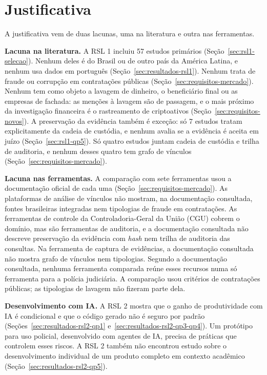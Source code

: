 \section{Justificativa}
\label{sec:intro-justificativa}

A justificativa vem de duas lacunas, uma na literatura e outra nas
ferramentas.

\textbf{Lacuna na literatura.} A RSL 1 incluiu 57 estudos primários
(Seção~\ref{sec:rsl1-selecao}). Nenhum deles é do Brasil ou de outro país da
América Latina, e nenhum usa dados em português
(Seção~\ref{sec:resultados-rsl1}). Nenhum trata de fraude ou corrupção em
contratações públicas (Seção~\ref{sec:requisitos-mercado}). Nenhum tem como
objeto a lavagem de dinheiro, o beneficiário final ou as empresas de
fachada: as menções à lavagem são de passagem, e o mais próximo da
investigação financeira é o rastreamento de criptoativos
(Seção~\ref{sec:requisitos-novos}). A preservação da
evidência também é exceção: só 7 estudos tratam explicitamente da cadeia de
custódia, e nenhum avalia se a evidência é aceita em juízo
(Seção~\ref{sec:rsl1-qp5}). Só quatro estudos juntam cadeia de custódia e
trilha de auditoria, e nenhum desses quatro tem grafo de vínculos
(Seção~\ref{sec:requisitos-mercado}).

\textbf{Lacuna nas ferramentas.} A comparação com sete ferramentas usou a
documentação oficial de cada uma (Seção~\ref{sec:requisitos-mercado}). As
plataformas de análise de vínculos não mostram, na documentação consultada,
fontes brasileiras integradas nem tipologias de fraude em contratações. As
ferramentas de controle da Controladoria-Geral da União (CGU) cobrem o
domínio, mas são ferramentas de auditoria, e a documentação consultada não
descreve preservação da evidência com \textit{hash} nem trilha de auditoria
das consultas. Na ferramenta de captura de evidências, a documentação
consultada não mostra grafo de vínculos nem tipologias. Segundo a
documentação consultada, nenhuma ferramenta comparada reúne esses recursos
numa só ferramenta para a polícia judiciária. A comparação usou critérios
de contratações públicas; as tipologias de lavagem não fizeram parte dela.

\textbf{Desenvolvimento com IA.} A RSL 2 mostra que o ganho de produtividade
com IA é condicional e que o código gerado não é seguro por padrão
(Seções~\ref{sec:resultados-rsl2-qp1} e~\ref{sec:resultados-rsl2-qp3-qp4}).
Um protótipo para uso policial, desenvolvido com agentes de IA, precisa de
práticas que controlem esses riscos. A RSL 2 também não encontrou estudo
sobre o desenvolvimento individual de um produto completo em contexto
acadêmico (Seção~\ref{sec:resultados-rsl2-qp5}).

